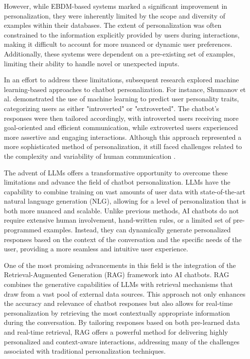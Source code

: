 However, while EBDM-based systems marked a significant improvement in personalization, they were inherently limited by the scope and diversity of examples within their databases. The extent of personalization was often constrained to the information explicitly provided by users during interactions, making it difficult to account for more nuanced or dynamic user preferences. Additionally, these systems were dependent on a pre-existing set of examples, limiting their ability to handle novel or unexpected inputs.

In an effort to address these limitations, subsequent research explored machine learning-based approaches to chatbot personalization. For instance, Shumanov et al. demonstrated the use of machine learning to predict user personality traits, categorizing users as either "introverted" or "extroverted". The chatbot's responses were then tailored accordingly, with introverted users receiving more goal-oriented and efficient communication, while extroverted users experienced more assertive and engaging interactions. Although this approach represented a more sophisticated method of personalization, it still faced challenges related to the complexity and variability of human communication \cite{shumanov2021making}.

The advent of LLMs offers a transformative opportunity to overcome these limitations and advance the field of chatbot personalization. LLMs have the capability to combine training on vast amounts of user data with state-of-the-art natural language generation (NLG), allowing for a level of personalization that is both more nuanced and scalable. Unlike previous methods, AI chatbots do not require extensive human involvement, hand-written rules, or a limited set of pre-programmed examples. Instead, they can dynamically generate personalized responses based on the context of the conversation and the specific needs of the user, providing a more seamless and intuitive user experience.

One of the most promising advancements in this field is the integration of the Retrieval-Augmented Generation (RAG) framework into AI chatbots. RAG combines the generative capabilities of LLMs with retrieval mechanisms that draw from a vast pool of external data sources. This approach not only enhances the accuracy and relevance of chatbot responses but also allows for real-time personalization by retrieving the most contextually appropriate information during the conversation. By tailoring responses based on both pre-learned data and real-time retrieval, RAG offers a powerful method for delivering highly personalized and context-aware interactions, addressing many of the challenges associated with traditional personalization techniques.

